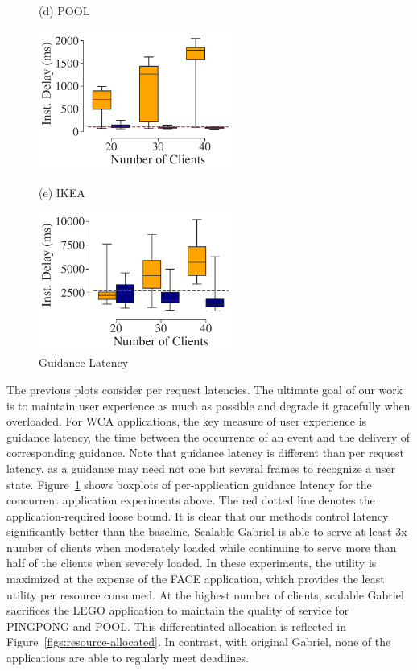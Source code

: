 \begin{figure}[]
\begin{turn}{90}{\hspace{0.6in}\small (d)
POOL}\end{turn}\hspace{0.2in}\includegraphics[width=2.5in, trim=0em 0em 0em 0em,
clip]{FIGS/fig-sec6-latency-pool.pdf}\\[0.08in]
  \vspace{0in}
\begin{turn}{90}{\hspace{0.6in}\small (e) IKEA}\end{turn}\hspace{0.2in}\includegraphics[width=2.5in, trim=0em 0em 0em 0em, clip]{FIGS/fig-sec6-latency-ikea.pdf}
\caption{Guidance Latency}
\label{figs:inst-delay}
\end{figure}
		
The previous plots consider per request latencies. The ultimate goal of our work
is to maintain user experience as much as possible and degrade it gracefully
when overloaded. For WCA applications, the key measure of user experience is
guidance latency, the time between the occurrence of an event and the delivery
of corresponding guidance. Note that guidance latency is different than per
request latency, as a guidance may need not one but several frames to recognize
a user state. Figure~\ref{figs:inst-delay} shows boxplots of per-application
guidance latency for the concurrent application experiments above. The red
dotted line denotes the application-required loose bound. It is clear that our
methods control latency significantly better than the baseline. Scalable Gabriel
is able to serve at least 3x number of clients when moderately loaded while
continuing to serve more than half of the clients when severely loaded. In these
experiments, the utility is maximized at the expense of the FACE application,
which provides the least utility per resource consumed. At the highest number of
clients, scalable Gabriel sacrifices the LEGO application to maintain the
quality of service for PINGPONG and POOL. This differentiated allocation is
reflected in Figure~\ref{figs:resource-allocated}. In contrast, with original
Gabriel, none of the applications are able to regularly meet deadlines.

\clearpage